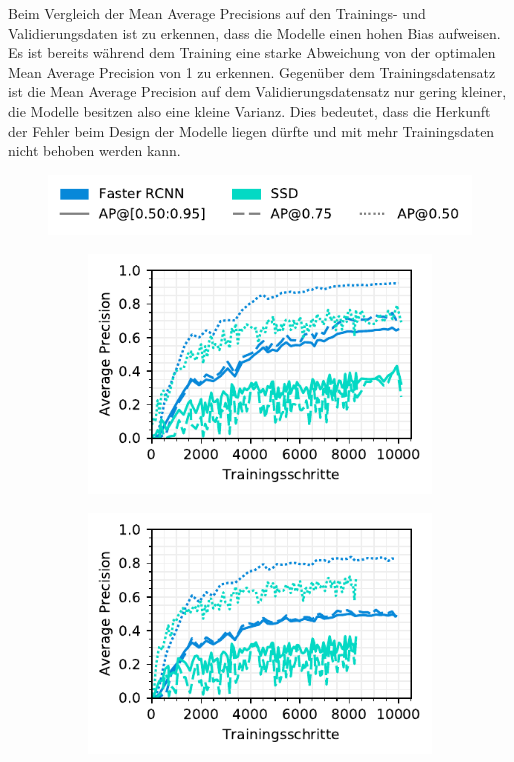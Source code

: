Beim Vergleich der Mean Average Precisions auf den Trainings- und Validierungsdaten ist zu erkennen, dass die Modelle einen hohen Bias aufweisen. Es ist bereits während dem Training eine starke Abweichung von der optimalen Mean Average Precision von 1 zu erkennen. Gegenüber dem Trainingsdatensatz ist die Mean Average Precision auf dem Validierungsdatensatz nur gering kleiner, die Modelle besitzen also eine kleine Varianz. Dies bedeutet, dass die Herkunft der Fehler beim Design der Modelle liegen dürfte und mit mehr Trainingsdaten nicht behoben werden kann. 

\begin{figure}[H]
  \captionsetup{width=.9\linewidth}
  \caption{TODO}
  \label{fig:3ap-map}
  \centering
  \includegraphics[scale=1]{graphics/matplot/img-detection__legend_3.pdf}
  \begin{subfigure}[t]{0.5\linewidth}
    \centering
    \includegraphics[scale=1]{graphics/matplot/img-detection__all__ap__train.pdf}
    \label{fig:3ap-map:map_train}
    \vspace{2ex}
  \end{subfigure}%
  \begin{subfigure}[t]{0.5\linewidth}
    \centering
    \includegraphics[scale=1]{graphics/matplot/img-detection__all__ap.pdf}

\end{subfigure}
\end{figure}
